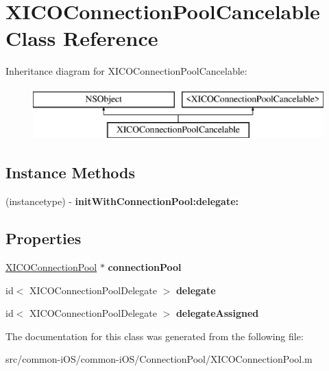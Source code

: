 \hypertarget{interface_x_i_c_o_connection_pool_cancelable}{}\section{X\+I\+C\+O\+Connection\+Pool\+Cancelable Class Reference}
\label{interface_x_i_c_o_connection_pool_cancelable}
Inheritance diagram for X\+I\+C\+O\+Connection\+Pool\+Cancelable\+:\begin{figure}[H]
\begin{center}
\leavevmode
\includegraphics[height=2.000000cm]{interface_x_i_c_o_connection_pool_cancelable}
\end{center}
\end{figure}
\subsection*{Instance Methods}
\begin{DoxyCompactItemize}
\item 
\hypertarget{interface_x_i_c_o_connection_pool_cancelable_aa8efb4c29b85ae514e01907131a115d0}{}\label{interface_x_i_c_o_connection_pool_cancelable_aa8efb4c29b85ae514e01907131a115d0} 
(instancetype) -\/ {\bfseries init\+With\+Connection\+Pool\+:delegate\+:}
\end{DoxyCompactItemize}
\subsection*{Properties}
\begin{DoxyCompactItemize}
\item 
\hypertarget{interface_x_i_c_o_connection_pool_cancelable_ad538cb5a5b130cac3ac4035ac09c0d50}{}\label{interface_x_i_c_o_connection_pool_cancelable_ad538cb5a5b130cac3ac4035ac09c0d50} 
\hyperlink{interface_x_i_c_o_connection_pool}{X\+I\+C\+O\+Connection\+Pool} $\ast$ {\bfseries connection\+Pool}
\item 
\hypertarget{interface_x_i_c_o_connection_pool_cancelable_a4adf2960b439c2be5d0aa1e96152b87e}{}\label{interface_x_i_c_o_connection_pool_cancelable_a4adf2960b439c2be5d0aa1e96152b87e} 
id$<$ X\+I\+C\+O\+Connection\+Pool\+Delegate $>$ {\bfseries delegate}
\item 
\hypertarget{interface_x_i_c_o_connection_pool_cancelable_aea5bdb08460b1261f91e55a0fef26eb0}{}\label{interface_x_i_c_o_connection_pool_cancelable_aea5bdb08460b1261f91e55a0fef26eb0} 
id$<$ X\+I\+C\+O\+Connection\+Pool\+Delegate $>$ {\bfseries delegate\+Assigned}
\end{DoxyCompactItemize}


The documentation for this class was generated from the following file\+:\begin{DoxyCompactItemize}
\item 
src/common-\/i\+O\+S/common-\/i\+O\+S/\+Connection\+Pool/X\+I\+C\+O\+Connection\+Pool.\+m\end{DoxyCompactItemize}
